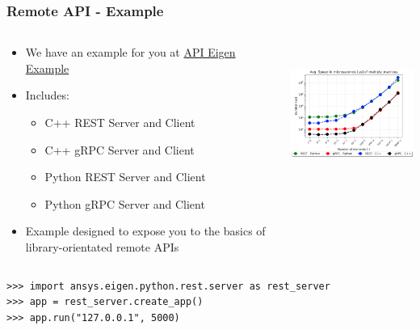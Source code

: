 \documentclass[t]{beamer}
\begin{document}
\begin{frame}[fragile=singleslide]
  \frametitle{Remote API - Example}
  \vspace{-10pt}

  \begin{columns}[T]
    \begin{column}{.6\textwidth}
      \vspace{-5pt}
      \begin{itemize}
      \item{We have an example for you at
        \href{https://apieigen.docs.ansys.com/index.html}{API Eigen Example}}
      \item{Includes:}
        \begin{itemize}
        \item{C++ REST Server and Client}
        \item{C++ gRPC Server and Client}
        \item{Python REST Server and Client}
        \item{Python gRPC Server and Client}
        \end{itemize}
      \item{Example designed to expose you to the basics of library-orientated
        remote APIs}
      \end{itemize}
    \end{column}

    \begin{column}{.45\textwidth}
      \centering
      \includegraphics[height=4.5cm]{figures/api-benchmark.png}
    \end{column}

  \end{columns}

      \begin{example}
      \vspace{-5pt}
        \begin{lstlisting}[basicstyle=\tiny]
>>> import ansys.eigen.python.rest.server as rest_server
>>> app = rest_server.create_app()
>>> app.run("127.0.0.1", 5000)
        \end{lstlisting}
        \vspace{-5pt}
      \end{example}


\end{frame}

\lastframe{}
\end{document}
